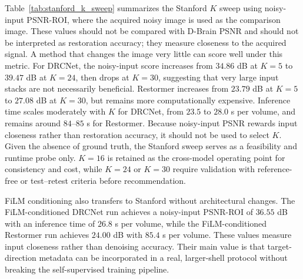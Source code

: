 \documentclass[preprint,12pt]{elsarticle}
\begin{document}
Table~\ref{tab:stanford_k_sweep} summarizes the Stanford $K$ sweep using noisy-input PSNR-ROI, where the acquired noisy image is used as the comparison image. These values should not be compared with D-Brain PSNR and should not be interpreted as restoration accuracy; they measure closeness to the acquired signal. A method that changes the image very little can score well under this metric. For DRCNet, the noisy-input score increases from $34.86$ dB at $K=5$ to $39.47$ dB at $K=24$, then drops at $K=30$, suggesting that very large input stacks are not necessarily beneficial. Restormer increases from $23.79$ dB at $K=5$ to $27.08$ dB at $K=30$, but remains more computationally expensive. Inference time scales moderately with $K$ for DRCNet, from $23.5$ to $28.0$ s per volume, and remains around $84$--$85$ s for Restormer. Because noisy-input PSNR rewards input closeness rather than restoration accuracy, it should not be used to select $K$. Given the absence of ground truth, the Stanford sweep serves as a feasibility and runtime probe only. $K=16$ is retained as the cross-model operating point for consistency and cost, while $K=24$ or $K=30$ require validation with reference-free or test--retest criteria before recommendation.

FiLM conditioning also transfers to Stanford without architectural changes. The FiLM-conditioned DRCNet run achieves a noisy-input PSNR-ROI of $36.55$ dB with an inference time of $26.8$ s per volume, while the FiLM-conditioned Restormer run achieves $24.00$ dB with $85.4$ s per volume. These values measure input closeness rather than denoising accuracy. Their main value is that target-direction metadata can be incorporated in a real, larger-shell protocol without breaking the self-supervised training pipeline.
\end{document}
